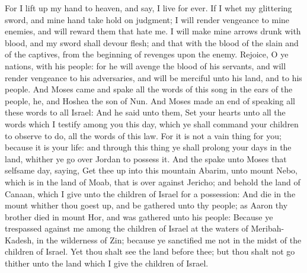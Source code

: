 \begin{biblechapter}
\verse For I lift up my hand to heaven, and say, I live for ever.
\verse If I whet my glittering sword, and mine hand take hold on judgment; I will render vengeance to mine enemies, and will reward them that hate me.
\verse I will make mine arrows drunk with blood, and my sword shall devour flesh; and that with the blood of the slain and of the captives, from the beginning of revenges upon the enemy.
\verse Rejoice, O ye nations, with his people: for he will avenge the blood of his servants, and will render vengeance to his adversaries, and will be merciful unto his land, and to his people.
\verse And Moses came and spake all the words of this song in the ears of the people, he, and Hoshea the son of Nun.
\verse And Moses made an end of speaking all these words to all Israel:
\verse And he said unto them, Set your hearts unto all the words which I testify among you this day, which ye shall command your children to observe to do, all the words of this law.
\verse For it is not a vain thing for you; because it is your life: and through this thing ye shall prolong your days in the land, whither ye go over Jordan to possess it.
 And the \LORD spake unto Moses that selfsame day, saying,
\verse Get thee up into this mountain Abarim, unto mount Nebo, which is in the land of Moab, that is over against Jericho; and behold the land of Canaan, which I give unto the children of Israel for a possession:
\verse And die in the mount whither thou goest up, and be gathered unto thy people; as Aaron thy brother died in mount Hor, and was gathered unto his people:
\verse Because ye trespassed against me among the children of Israel at the waters of Meribah-Kadesh, in the wilderness of Zin; because ye sanctified me not in the midst of the children of Israel.
\verse Yet thou shalt see the land before thee; but thou shalt not go thither unto the land which I give the children of Israel.
\end{biblechapter}


